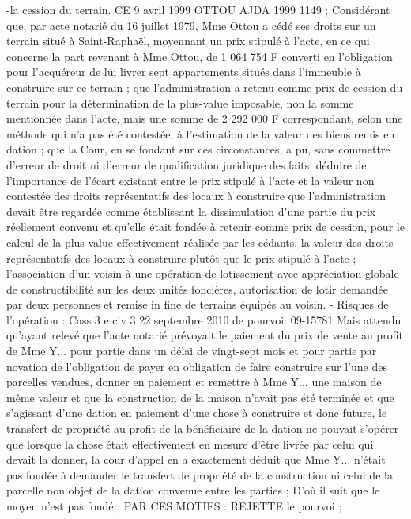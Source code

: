 \documentclass[11pt,a4paper]{report}
\begin{document}
	-la cession du terrain. CE 9 avril 1999 OTTOU AJDA 1999 1149 ; Considérant que, par acte notarié du 16
	juillet 1979, Mme Ottou a cédé ses droits sur un terrain situé à Saint-Raphaël, moyennant un prix stipulé à
	l'acte, en ce qui concerne la part revenant à Mme Ottou, de 1 064 754 F converti en l'obligation pour
	l'acquéreur de lui livrer sept appartements situés dans l'immeuble à construire sur ce terrain ; que
	l'administration a retenu comme prix de cession du terrain pour la détermination de la plus-value
	imposable, non la somme mentionnée dans l'acte, mais une somme de 2 292 000 F correspondant, selon une
	méthode qui n'a pas été contestée, à l'estimation de la valeur des biens remis en dation ; que la Cour, en se
	fondant sur ces circonstances, a pu, sans commettre d'erreur de droit ni d'erreur de qualification juridique
	des faits, déduire de l'importance de l'écart existant entre le prix stipulé à l'acte et la valeur non contestée
	des droits représentatifs des locaux à construire que l'administration devait être regardée comme
	établissant la dissimulation d'une partie du prix réellement convenu et qu'elle était fondée à retenir comme
	prix de cession, pour le calcul de la plus-value effectivement réalisée par les cédants, la valeur des droits
	représentatifs des locaux à construire plutôt que le prix stipulé à l'acte ;
	- l’association d’un voisin à une opération de lotissement avec appréciation globale de constructibilité sur
	les deux unités foncières, autorisation de lotir demandée par deux personnes et remise in fine de terrains
	équipés au voisin.
	- Risques de l’opération : Cass 3 e civ 3 22 septembre 2010 \No  de pourvoi: 09-15781
	Mais attendu qu'ayant relevé que l'acte notarié prévoyait le paiement du prix de vente au profit de Mme Y...
	pour partie dans un délai de vingt-sept mois et pour partie par novation de l'obligation de payer en
	obligation de faire construire sur l'une des parcelles vendues, donner en paiement et remettre à Mme Y...
	une maison de même valeur et que la construction de la maison n'avait pas été terminée et que s'agissant
	d'une dation en paiement d'une chose à construire et donc future, le transfert de propriété au profit de la
	bénéficiaire de la dation ne pouvait s'opérer que lorsque la chose était effectivement en mesure d'être livrée
	par celui qui devait la donner, la cour d'appel en a exactement déduit que Mme Y... n'était pas fondée à
	demander le transfert de propriété de la construction ni celui de la parcelle non objet de la dation convenue
	entre les parties ; D'où il suit que le moyen n'est pas fondé ; PAR CES MOTIFS : REJETTE le pourvoi ;
\end{document}
